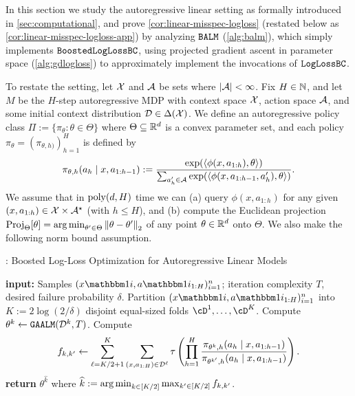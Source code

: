 


In this section we study the autoregressive linear setting as formally introduced in \cref{sec:computational}, and prove \cref{cor:linear-misspec-logloss} (restated below as \cref{cor:linear-misspec-logloss-app}) by analyzing $\texttt{BALM}$ (\cref{alg:balm}), which simply implements $\texttt{BoostedLogLossBC}$, using projected gradient ascent in parameter space (\cref{alg:gdlogloss}) to approximately implement the invocations of $\texttt{LogLossBC}$. 

To restate the setting, let $\mathcal{X}$ and $\mathcal{A}$ be sets where $|\mathcal{A}|<\infty$. Fix $H \in \mathbb{N}$, and let $M$ be the $H$-step autoregressive MDP with context space $\mathcal{X}$, action space $\mathcal{A}$, and some initial context distribution $\mathcal{D} \in \Delta(\mathcal{X})$. We define an autoregressive policy class $\Pi := \{\pi_\theta: \theta \in \Theta\}$ where $\Theta \subseteq \mathbb{R}^d$ is a convex parameter set, and each policy $\pi_\theta = (\pi_{\theta,h)})_{h=1}^H$ is defined by
\begin{equation} \pi_{\theta,h}(a_h\mid{}x,a_{1:h-1}) := \frac{\exp(\langle \phi(x,a_{1:h}), \theta\rangle)}{\sum_{a'_h\in\mathcal{A}} \exp(\langle \phi(x,a_{1:h-1},a'_h),\theta\rangle)}.\label{eq:auto-linear-app}
\end{equation}
We assume that in $\mathrm{poly}(d,H)$ time we can (a) query $\phi(x,a_{1:h})$ for any given $(x,a_{1:h}) \in \mathcal{X}\times\mathcal{A}^\star$ (with $h \leq H$), and (b) compute the Euclidean projection $\operatorname{Proj}_\Theta[\theta] = \operatorname*{arg\,min}_{\theta'\in\Theta}\left \lVert \theta-\theta' \right \rVert_2$ of any point $\theta \in \mathbb{R}^d$ onto $\Theta$. We also make the following norm bound assumption.

\begin{algorithm}[t]
\caption{\BALM: Boosted Log-Loss Optimization for Autoregressive Linear Models}\label{alg:balm}
\begin{algorithmic}[1]
\State\textbf{input:} Samples $(x\ind{i},a\ind{i}_{1:H})_{i=1}^n$; iteration complexity $T$, desired failure probability $\delta$.
\State Partition $(x\ind{i},a\ind{i}_{1:H})_{i=1}^n$ into $K := 2\log(2/\delta)$ disjoint equal-sized folds $\cD^1,\dots,\cD^K$.
    \State Compute $\theta^k \gets \texttt{GAALM}(\mathcal{D}^k, T)$.\hfill{}
\EndFor
{}
    \State Compute 
    \[f_{k,k'} \gets \sum_{\ell=K/2+1}^K \sum_{(x,a_{1:H})\in\mathcal{D}^\ell} \tau\left(\prod_{h=1}^H \frac{\pi_{\theta^k,h}(a_h\mid{}x,a_{1:h-1})}{\pi_{\theta^{k'},h}(a_h\mid{}x,a_{1:h-1})}\right).\]
\EndFor
\State \textbf{return} $\theta^{\widehat k}$ where $\widehat k := \operatorname*{arg\,min}_{k\in[K/2]} \max_{k'\in[K/2]} f_{k,k'}$.
\end{algorithmic}
\end{algorithm}

